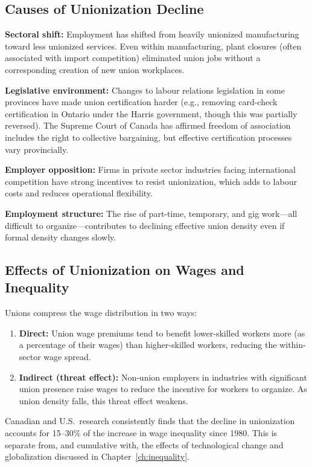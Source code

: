 \subsection{Causes of Unionization Decline}

\textbf{Sectoral shift:} Employment has shifted from heavily unionized manufacturing toward less unionized services. Even within manufacturing, plant closures (often associated with import competition) eliminated union jobs without a corresponding creation of new union workplaces.

\textbf{Legislative environment:} Changes to labour relations legislation in some provinces have made union certification harder (e.g., removing card-check certification in Ontario under the Harris government, though this was partially reversed). The Supreme Court of Canada has affirmed freedom of association includes the right to collective bargaining, but effective certification processes vary provincially.

\textbf{Employer opposition:} Firms in private sector industries facing international competition have strong incentives to resist unionization, which adds to labour costs and reduces operational flexibility.

\textbf{Employment structure:} The rise of part-time, temporary, and gig work---all difficult to organize---contributes to declining effective union density even if formal density changes slowly.

\subsection{Effects of Unionization on Wages and Inequality}

Unions compress the wage distribution in two ways:

\begin{enumerate}
  \item \textbf{Direct:} Union wage premiums tend to benefit lower-skilled workers more (as a percentage of their wages) than higher-skilled workers, reducing the within-sector wage spread.
  \item \textbf{Indirect (threat effect):} Non-union employers in industries with significant union presence raise wages to reduce the incentive for workers to organize. As union density falls, this threat effect weakens.
\end{enumerate}

Canadian and U.S.\ research consistently finds that the decline in unionization accounts for 15--30\% of the increase in wage inequality since 1980. This is separate from, and cumulative with, the effects of technological change and globalization discussed in Chapter~\ref{ch:inequality}.

